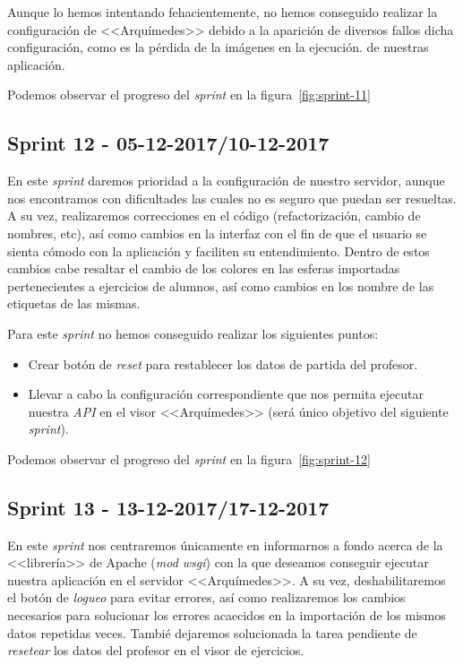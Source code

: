 Aunque lo hemos intentando fehacientemente, no hemos conseguido realizar la configuración de <<Arquímedes>> debido a la aparición de diversos fallos dicha configuración, como es la pérdida de la imágenes en la ejecución. de nuestras aplicación.

Podemos observar el progreso del \textit{sprint} en la figura~\ref{fig:sprint-11}

\subsection{Sprint 12 - 05-12-2017/10-12-2017}
En este \textit{sprint} daremos prioridad a la configuración de nuestro servidor, aunque nos encontramos con dificultades las cuales no es seguro que puedan ser resueltas. A su vez, realizaremos correcciones en el código (refactorización, cambio de nombres, etc), así como cambios en la interfaz con el fin de que el usuario se sienta cómodo con la aplicación y faciliten su entendimiento. Dentro de estos cambios cabe resaltar el cambio de los colores en las esferas importadas pertenecientes a ejercicios de alumnos, así como cambios en los nombre de las etiquetas de las mismas.

Para este \textit{sprint} no hemos conseguido realizar  los siguientes puntos:
\begin{itemize}
	\item Crear botón de \textit{reset} para restablecer los datos de partida del profesor.
	\item Llevar a cabo la configuración correspondiente que nos permita ejecutar nuestra \textit{API} en el visor <<Arquímedes>> (será único objetivo del siguiente \textit{sprint}).
\end{itemize}

Podemos observar el progreso del \textit{sprint} en la figura~\ref{fig:sprint-12}

\subsection{Sprint 13 - 13-12-2017/17-12-2017}
En este \textit{sprint} nos centraremos únicamente en informarnos a fondo acerca de la <<librería>> de Apache (\textit{mod wsgi}) con la que deseamos conseguir ejecutar nuestra aplicación en el servidor <<Arquímedes>>. A su vez, deshabilitaremos el botón de \textit{logueo} para evitar errores, así como realizaremos los cambios necesarios para solucionar los errores acaecidos en la importación de los mismos datos repetidas veces. Tambié dejaremos solucionada la tarea pendiente de \textit{resetear} los datos del profesor en el visor de ejercicios.

